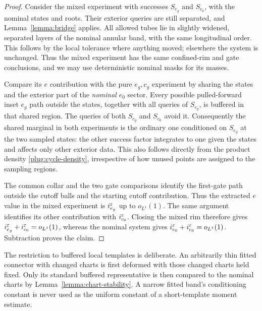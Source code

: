 \begin{proof}
Consider the mixed experiment with successes $S_{e_g}$ and $S_{c_0}$,
with the nominal states and roots.  Their exterior queries are still
separated, and Lemma~\ref{lemma:bridge} applies.  All allowed tubes lie
in slightly widened, separated layers of the nominal annular band,
with the same longitudinal order.  This follows by the local tolerance
where anything moved; elsewhere the system is unchanged.  Thus the mixed
experiment has the same confined-rim and gate conclusions, and we may
use deterministic nominal masks for its masses.

Compare its $e$ contribution with the pure $e_g,c_g$ experiment by
sharing the states and the exterior part of the \emph{nominal} $e_0$
sector.  Every possible pulled-forward inset $e_g$ path outside the
states, together with all queries of $S_{e_g}$, is buffered in that
shared region.  The queries of both $S_{c_g}$ and $S_{c_0}$ avoid it.
Consequently the shared marginal in both experiments is the ordinary
one conditioned on $S_{e_g}$ at the two sampled states: the other
success factor integrates to one given the states and affects only
other exterior data.  This also follows directly from the product
density \eqref{plug:cycle-density}, irrespective of how unused points
are assigned to the sampling regions.

The common collar and the two gate comparisons identify the first-gate
path outside the cutoff balls and the starting cutoff contribution.
Thus the extracted $e$ value in the mixed experiment is $i_{e_g}^\varepsilon$
up to $o_{L^1}(1)$.  The same argument identifies its other contribution
with $i_{c_0}^\varepsilon$.  Closing the mixed rim therefore gives
$i_{e_g}^\varepsilon+i_{c_0}^\varepsilon=o_{L^1}(1)$, whereas the nominal system gives
$i_{e_0}^\varepsilon+i_{c_0}^\varepsilon=o_{L^1}(1)$.  Subtraction proves the claim.
\end{proof}

The restriction to buffered local templates is deliberate.  An
arbitrarily thin fitted connector with changed charts is first deformed
with those changed charts held fixed.  Only its standard buffered
representative is then compared to the nominal charts by
Lemma~\ref{lemma:chart-stability}.  A narrow fitted band's conditioning
constant is never used as the uniform constant of a short-template
moment estimate.
